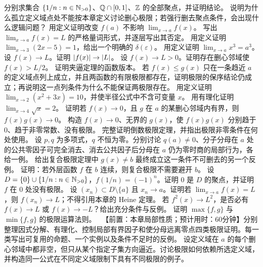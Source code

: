 \begin{enumerate}[label=\textbf{\thechapter.\arabic*.},ref=\thechapter.\arabic*,leftmargin=3.4em,labelsep=0.7em,itemsep=0.85em,topsep=0.8em]
  分别求集合 \(\{1/n:n\in\mathbb{N}_{>0}\}\)、\(\mathbb{Q}\cap[0,1]\)、\(\mathbb{Z}\) 的全部聚点，并证明结论。
   说明为什么孤立定义域点处不能按本章定义讨论删心极限；若强行删去聚点条件，会出现什么逻辑问题？
   用定义证明改变 \(f(a)\) 不影响 \(\lim_{x\to a}f(x)\)。
   写出 \(\lim_{x\to a}f(x)=L\) 的严格量词形式，并逐层写出其否定。
   用定义证明 \(\lim_{x\to3}(2x-5)=1\)，给出一个明确的 \(\delta(\varepsilon)\)。
   用定义证明 \(\lim_{x\to a}x^3=a^3\)。
   设 \(f(x)\to L\)。证明 \(\left|f(x)\right|\to\left|L\right|\)。
   设 \(f(x)\to L>0\)。证明存在删心邻域使 \(f(x)>L/2\)。
  证明夹逼定理的函数版本。
   若 \(f(x)\le g(x)\) 只在一条趋近 \(a\) 的定义域点列上成立，并且两函数的有限极限都存在，证明极限的保序结论仍成立；再说明这一点列条件为什么不能保证两极限存在。
   用定义证明 \(\lim_{x\to2}(x^2+3x)=10\)，并使半径公式中不含可变量 \(x\)。
   用有理化证明 \(\lim_{x\to4}\sqrt x=2\)。
   证明若 \(f(x)\to0\)，且 \(g\) 在 \(a\) 的某删心邻域内有界，则 \(f(x)g(x)\to0\)。
   构造 \(f(x)\to0\)、无界的 \(g(x)\)，使 \(f(x)g(x)\) 分别趋于 \(0\)、趋于非零常数、没有极限。
   完整证明倒数极限定理，并指出极限非零条件在何处使用。
   设 \(p,q\) 为多项式，\(q\) 不恒为零。分别讨论 \(q(a)\ne0\)、分子分母在 \(a\) 处的公共零因子可完全消去、消去公共因子后分母在 \(a\) 仍为零时商的局部行为，各给一例。
   给出复合极限定理中 \(g(x)\ne b\) 最终成立这一条件不可删去的另一个反例。
   证明：若外层函数 \(f\) 在 \(b\) 连续，则复合极限不需要避开 \(b\)。
  设 \(D=\{0\}\cup\{1/n:n\in\mathbb{N}_{>0}\}\)，\(f(1/n)=(-1)^n\)。证明 \(0\) 是 \(D\) 的聚点，并证明 \(f\) 在 \(0\) 处没有极限。
   设 \((x_n)\subset D\setminus\{a\}\) 且 \(x_n\to a\)。证明若 \(\lim_{x\to a}f(x)=L\)，则 \(f(x_n)\to L\)；不得引用本章的 Heine 定理。
   若 \(f^2(x)\to L^2\)，是否必有 \(f(x)\to L\) 或 \(f(x)\to-L\)？给出充分条件与反例。
   证明 \(\max\{f,g\}\) 与 \(\min\{f,g\}\) 的极限运算法则。
  \ 【前置：本章局部性质；预计用时：60分钟】分别整理因式分解、有理化、控制局部有界因子和使分母远离零点四类极限证明。每一类写出可复用的命题、一个实例以及条件不足时的反例。
   设定义域在 \(a\) 的每个删心邻域中都非空，但只从某个指定子集方向逼近。讨论极限如何依赖所选定义域，并构造同一公式在不同定义域限制下具有不同极限的例子。

\end{enumerate}


